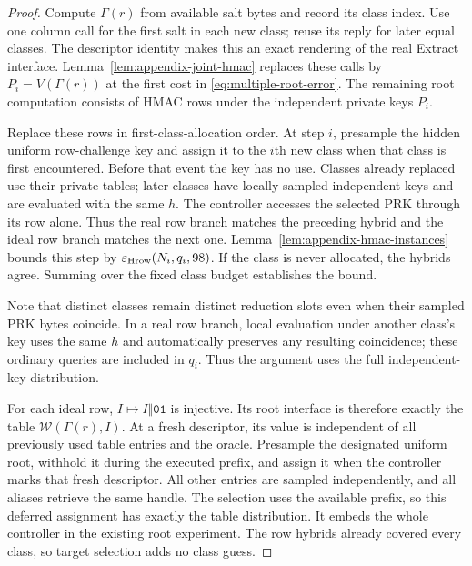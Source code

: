 \documentclass[pdflatex]{sn-jnl}
\theoremstyle{thmstyleone}
\theoremstyle{thmstylethree}
\theoremstyle{thmstyletwo}
\begin{document}
\begin{proof}
Compute $\Gamma(r)$ from available salt bytes and record its class index.
Use one column call for the first salt in each new class; reuse its reply for
later equal classes. The descriptor identity makes this an exact rendering
of the real Extract interface. Lemma~\ref{lem:appendix-joint-hmac} replaces
these calls by $P_i=V(\Gamma(r))$ at the first cost in
\eqref{eq:multiple-root-error}. The remaining root computation consists of
HMAC rows under the independent private keys $P_i$.

Replace these rows in first-class-allocation order. At step $i$, presample
the hidden uniform row-challenge key and assign it to the $i$th new class
when that class is first encountered. Before that event the key has no use.
Classes already replaced use their private tables; later classes have locally
sampled independent keys and are evaluated with the same $h$. The controller
accesses the selected PRK through its row alone. Thus the real row branch
matches the preceding hybrid and the ideal row branch matches the next one.
Lemma~\ref{lem:appendix-hmac-instances} bounds this step by
$\varepsilon_{\rm Hrow}(N_i,q_i,98)$. If the class is never allocated, the
hybrids agree. Summing over the fixed class budget establishes the bound.

Note that distinct classes remain distinct reduction slots even when their sampled
PRK bytes coincide. In a real row branch, local evaluation under another
class's key uses the same $h$ and automatically preserves any resulting
coincidence; these ordinary queries are included in $q_i$. Thus the argument
uses the full independent-key distribution.

For each ideal row, $I\mapsto I\Vert\mathtt{01}$ is injective. Its root
interface is therefore exactly the table $\mathcal W(\Gamma(r),I)$.
At a fresh descriptor, its value is independent of all previously used table
entries and the oracle. Presample the designated uniform root, withhold it
during the executed prefix, and assign it when the controller marks that
fresh descriptor. All other entries are sampled independently, and
all aliases retrieve the same handle. The selection uses the available
prefix, so this deferred assignment has exactly the table distribution.
It embeds the whole controller in the existing root experiment. The row
hybrids already covered every class, so target selection adds no class guess.
\end{proof}
\end{document}

